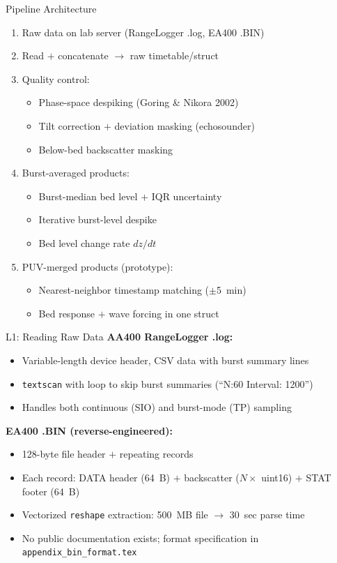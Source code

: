 \documentclass[10pt, aspectratio=169]{beamer}
\begin{document}
\begin{frame}{Pipeline Architecture}
  \begin{enumerate}
    \item[\textbf{L0}] Raw data on lab server (RangeLogger .log, EA400 .BIN)
    \item[\textbf{L1}] Read $+$ concatenate $\rightarrow$ raw timetable/struct
    \item[\textbf{L2}] Quality control:
      \begin{itemize}
        \item Phase-space despiking (Goring \& Nikora 2002)
        \item Tilt correction $+$ deviation masking (echosounder)
        \item Below-bed backscatter masking
      \end{itemize}
    \item[\textbf{L3}] Burst-averaged products:
      \begin{itemize}
        \item Burst-median bed level $+$ IQR uncertainty
        \item Iterative burst-level despike
        \item Bed level change rate $dz/dt$
      \end{itemize}
    \item[\textbf{L4}] PUV-merged products (prototype):
      \begin{itemize}
        \item Nearest-neighbor timestamp matching ($\pm$5~min)
        \item Bed response $+$ wave forcing in one struct
      \end{itemize}
  \end{enumerate}
\end{frame}

\begin{frame}{L1: Reading Raw Data}
  \textbf{AA400 RangeLogger .log:}
  \begin{itemize}
    \item Variable-length device header, CSV data with burst summary lines
    \item \texttt{textscan} with loop to skip burst summaries (``N:60 Interval: 1200'')
    \item Handles both continuous (SIO) and burst-mode (TP) sampling
  \end{itemize}
  \vspace{0.5em}
  \textbf{EA400 .BIN (reverse-engineered):}
  \begin{itemize}
    \item 128-byte file header $+$ repeating records
    \item Each record: DATA header (64~B) $+$ backscatter ($N \times$ uint16) $+$ STAT footer (64~B)
    \item Vectorized \texttt{reshape} extraction: 500~MB file $\rightarrow$ 30~sec parse time
    \item No public documentation exists; format specification in \texttt{appendix\_bin\_format.tex}
  \end{itemize}
\end{frame}
\end{document}
